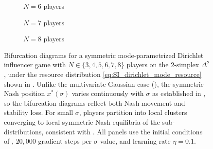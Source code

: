 \documentclass{article}
\begin{document}
\begin{figure}[ht!]
            \begin{subfigure}[b]{0.3\linewidth}
                \centering
                
                \caption{$N = 6$ players}
                \label{fig:simplex_dirl_bifurcation:e}
                \vspace{4ex}
            \end{subfigure}
            \begin{subfigure}[b]{0.3\linewidth}
                \centering
                
                \caption{$N = 7$ players}
                \label{fig:simplex_dirl_bifurcation:f}
                \vspace{4ex}
            \end{subfigure}
            \begin{subfigure}[b]{0.3\linewidth}
                \centering
                
                \caption{$N = 8$ players}
                \label{fig:simplex_dirl_bifurcation:g}
                \vspace{4ex}
            \end{subfigure}

            \begin{subfigure}[b]{0.75\linewidth}
                \centering
                
                \label{fig:simplex_dirl_bifurcation:colorbar}
            \end{subfigure}

            \caption{Bifurcation diagrams for a symmetric mode-parametrized Dirichlet influencer game with $N \in \{3,4,5,6,7,8\}$ players on the 2-simplex $\Delta^2$, under the resource distribution \cref{eq:SI_dirichlet_mode_resource} shown in .
                Unlike the multivariate Gaussian case (), the symmetric Nash position $x^*(\sigma)$ varies continuously with $\sigma$ as established in , so the bifurcation diagrams reflect both Nash movement and stability loss. For small $\sigma$, players partition into local clusters converging to local symmetric Nash equilibria of the sub-distributions, consistent with . All panels use the initial conditions of , $20{,}000$ gradient steps per $\sigma$ value, and learning rate $\eta = 0.1$.}
            \label{fig:simplex_dirl_bifurcation}
        \end{figure}
\end{document}

